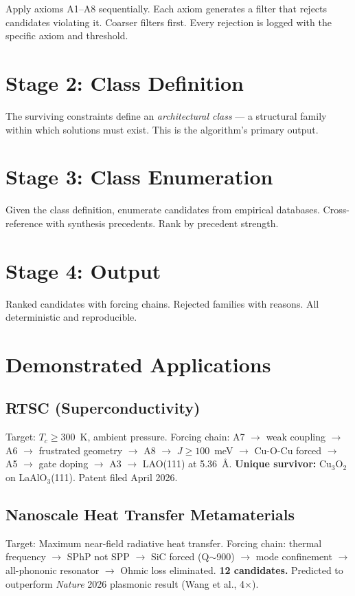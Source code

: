 \documentclass[11pt, a4paper]{article}
\begin{document}
Apply axioms A1--A8 sequentially. Each axiom generates a filter
that rejects candidates violating it. Coarser filters first.
Every rejection is logged with the specific axiom and threshold.

\section{Stage 2: Class Definition}

The surviving constraints define an \textit{architectural class}
--- a structural family within which solutions must exist. This
is the algorithm's primary output.

\section{Stage 3: Class Enumeration}

Given the class definition, enumerate candidates from empirical
databases. Cross-reference with synthesis precedents. Rank by
precedent strength.

\section{Stage 4: Output}

Ranked candidates with forcing chains. Rejected families with
reasons. All deterministic and reproducible.

\section{Demonstrated Applications}

\subsection{RTSC (Superconductivity)}

Target: $T_c \geq 300$~K, ambient pressure. Forcing chain:
A7 $\to$ weak coupling $\to$ A6 $\to$ frustrated geometry $\to$
A8 $\to$ $J \geq 100$~meV $\to$ Cu-O-Cu forced $\to$ A5 $\to$
gate doping $\to$ A3 $\to$ LAO(111) at 5.36~\AA.
\textbf{Unique survivor:} Cu$_3$O$_2$ on LaAlO$_3$(111).
Patent filed April 2026.

\subsection{Nanoscale Heat Transfer Metamaterials}

Target: Maximum near-field radiative heat transfer. Forcing chain:
thermal frequency $\to$ SPhP not SPP $\to$ SiC forced (Q$\sim$900)
$\to$ mode confinement $\to$ all-phononic resonator $\to$ Ohmic
loss eliminated. \textbf{12 candidates.} Predicted to outperform
\textit{Nature} 2026 plasmonic result (Wang et al., 4$\times$).
\end{document}
